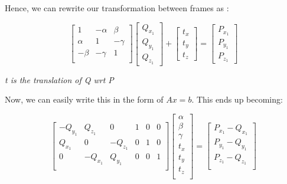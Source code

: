 Hence, we can rewrite our transformation between frames as :

\begin{equation}
\begin{bmatrix}
1 & -\alpha & \beta \\
\alpha & 1 & -\gamma \\
-\beta & -\gamma & 1\\
\end{bmatrix} \begin{bmatrix}Q_{x_1} \\ Q_{y_1} \\ Q_{z_1}\end{bmatrix} + \begin{bmatrix}t_x \\ t_y \\ t_z\end{bmatrix} = \begin{bmatrix} P_{x_1} \\ P_{y_1} \\ P_{z_1} \end{bmatrix}
\end{equation}

\textit{t is the translation of Q wrt P}

Now, we can easily write this in the form of $Ax=b$. This ends up becoming:

\begin{equation}
    \begin{bmatrix}
    -Q_{y_1} & Q_{z_1} & 0 & 1 & 0 & 0 \\
    Q_{x_1} & 0 & -Q_{z_1} & 0 & 1 & 0 \\
    0 & - Q_{x_1} & Q_{y_1} & 0 & 0 & 1 \\
    \end{bmatrix} \begin{bmatrix}
    \alpha \\
    \beta \\
    \gamma \\
    t_x \\
    t_y \\
    t_z \\
    \end{bmatrix} = \begin{bmatrix}
    P_{x_1} - Q_{x_1} \\
    P_{y_1} - Q_{y_1} \\
    P_{z_1} - Q_{z_1} \\
    \end{bmatrix}
\end{equation}


